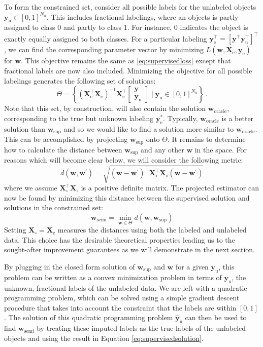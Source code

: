 \documentclass{article}
\newcommand{\Xe}{\vec{X}_\mathrm{e}  }
\newcommand{\XeT}{\vec{X}_\mathrm{e}^\top}
\newcommand{\ye}{\begin{bmatrix} \vec{y}  \\ \vec{y}_\mathrm{u} \end{bmatrix}}
\newcommand{\G}{\left(\Xe^\top \Xe \right)^{-1}}
\renewcommand{\vec}[1]{\mathbf{#1}}
\begin{document}
To form the constrained set, consider all possible labels for the unlabeled objects $\vec{y}_\text{u} \in [0,1]^{N_u}$. This includes fractional labelings, where an objects is partly assigned to class $0$ and partly to class $1$. For instance, $0$ indicates the object is exactly equally assigned to both classes. For a particular labeling $\vec{y}_\text{e}^\top = \left[ \vec{y}^\top \vec{y}_\text{u}^\top \right]^\top$, we can find the corresponding parameter vector by minimizing $L(\vec{w},\vec{X}_\text{e},\vec{y}_\text{e})$ for $\vec{w}$.
This objective remains the same as \eqref{eq:supervisedloss} except that fractional labels are now also included. Minimizing the objective for all possible labelings generates the following set of solutions:
\begin{equation}
\label{eq:constrainedregion}
\Theta=\left\{ \G \XeT \ye \mid \vec{y}_\text{u} \in [0,1]^{N_u} \right\} \, .
\end{equation}
Note that this set, by construction, will also contain the solution $\vec{w}_\text{oracle}$, corresponding to the true but unknown labeling $\vec{y}_\text{e}^{\ast}$. Typically, $\vec{w}_\text{oracle}$ is a better solution than $\vec{w}_\text{sup}$ and so we would like to find a solution more similar to $\vec{w}_\text{oracle}$. This can be accomplished by projecting $\vec{w}_\text{sup}$ onto $\Theta$. It remains to determine how to calculate the distance between $\vec{w}_\text{sup}$ and any other $\vec{w}$ in the space. For reasons which will become clear below, we will consider the following metric:
\begin{equation}
\label{eq:metric}
d(\vec{w},\vec{w}^\prime)=\sqrt{\left( \vec{w}-\vec{w}^\prime \right)^\top \vec{X}_{\circ}^\top \vec{X}_{\circ}  \left( \vec{w}-\vec{w}^\prime \right)}
\end{equation}
where we assume $\vec{X}_{\circ}^\top \vec{X}_{\circ}$ is a positive definite matrix. The projected estimator can now be found by minimizing this distance between the supervised solution and solutions in the constrained set:
\begin{equation}
\label{eq:projection}
\vec{w}_\mathrm{semi} = \min_{\vec{w} \in \Theta} d(\vec{w},\vec{w}_\text{sup})
\end{equation}
Setting $\vec{X}_\circ=\Xe$ measures the distances using both the labeled and unlabeled data. This choice has the desirable theoretical properties leading us to the sought-after improvement guarantees as we will demonstrate in the next section.

By plugging in the closed form solution of $\vec{w}_\text{sup}$ and $\vec{w}$ for a given $\vec{y}_\text{u}$, this problem can be written as a convex minimization problem in terms of $\vec{y}_\text{u}$, the unknown, fractional labels of the unlabeled data. We are left with a quadratic programming problem, which can be solved using a simple gradient descent procedure that takes into account the constraint that the labels are within $[0,1]$. The solution of this quadratic programming problem $\vec{\hat{y}}_\text{u}$ can then be used to find  $\vec{w}_\text{semi}$ by treating these imputed labels as the true labels of the unlabeled objects and using the result in Equation \eqref{eq:supervisedsolution}.
\end{document}
